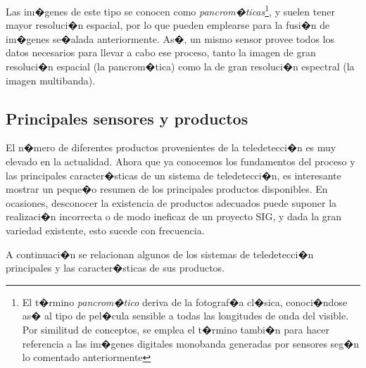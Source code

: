 Las im�genes de este tipo se conocen como \emph{pancrom�ticas}\footnote{El t�rmino \emph{pancrom�tico} deriva de la fotograf�a cl�sica, conoci�ndose as� al tipo de pel�cula sensible a todas las longitudes de onda del visible. Por similitud de conceptos, se emplea el t�rmino tambi�n para hacer referencia a las im�genes digitales monobanda generadas por sensores seg�n lo comentado anteriormente}, y suelen tener mayor resoluci�n espacial, por lo que pueden emplearse para la fusi�n de im�genes se�alada anteriormente. As�, un mismo sensor provee todos los datos necesarios para llevar a cabo ese proceso, tanto la imagen de gran resoluci�n espacial (la pancrom�tica) como la de gran resoluci�n espectral (la imagen multibanda).

\subsection{Principales sensores y productos}

El n�mero de diferentes productos provenientes de la teledetecci�n es muy elevado en la actualidad. Ahora que ya conocemos los fundamentos del proceso y las principales caracter�sticas de un sistema de teledetecci�n, es interesante mostrar un peque�o resumen de los principales productos disponibles. En ocasiones, desconocer la existencia de productos adecuados puede suponer la realizaci�n incorrecta o de modo ineficaz de un proyecto SIG, y dada la gran variedad existente, esto sucede con frecuencia. 

A continuaci�n se relacionan algunos de los sistemas de teledetecci�n principales y las caracter�sticas de sus productos.

